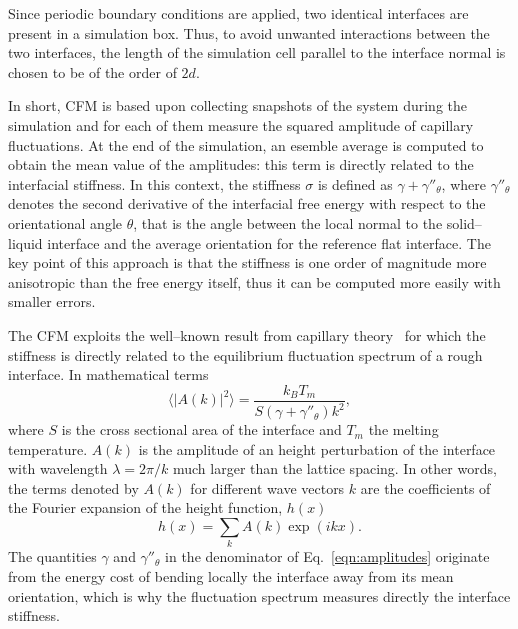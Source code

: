 Since periodic boundary conditions are applied, two identical interfaces are present in a simulation box. Thus, to avoid unwanted interactions between the two interfaces, the length of the simulation cell parallel to the interface normal is chosen to be of the order of $2d$.

In short, CFM is based upon collecting snapshots of the system during the simulation and for each of them measure the squared amplitude of capillary fluctuations. At the end of the simulation, an esemble average is computed to obtain the mean value of the amplitudes: this term is directly related to the interfacial stiffness. In this context, the stiffness $\sigma$ is defined as $\gamma + \gamma''_{\theta}$, where $\gamma''_{\theta}$ denotes the second derivative of the interfacial free energy with respect to the orientational angle $\theta$, that is the angle between the local normal to the solid--liquid interface and the average orientation for the reference flat interface. The key point of this approach is that the stiffness is one order of magnitude more anisotropic than the free energy itself, thus it can be computed more easily with smaller errors.

The CFM exploits the well--known result from capillary theory~\cite{Karma1993} for which the stiffness is directly related to the equilibrium fluctuation spectrum of a rough interface. In mathematical terms
\begin{equation}
    \langle \lvert A(k) \rvert^2 \rangle = \frac{k_B T_m}{S (\gamma + \gamma''_{\theta})k^2},
    \label{eqn:amplitudes}
\end{equation}
where $S$ is the cross sectional area of the interface and $T_m$ the melting temperature. $A(k)$ is the amplitude of an height perturbation of the interface with wavelength $\lambda=2\pi/k$ much larger than the lattice spacing. In other words, the terms denoted by $A(k)$ for different wave vectors $k$ are the coefficients of the Fourier expansion of the height function, $h(x)$
\begin{equation}
    h(x)= \sum_k A(k) \exp{(i k x)}.
    \label{eqn:fourier_expansion}
\end{equation}
The quantities $\gamma$ and $\gamma''_{\theta}$ in the denominator of Eq.~\ref{eqn:amplitudes} originate from the energy cost of bending locally the interface away from its mean orientation, which is why the fluctuation spectrum measures directly the interface stiffness.

